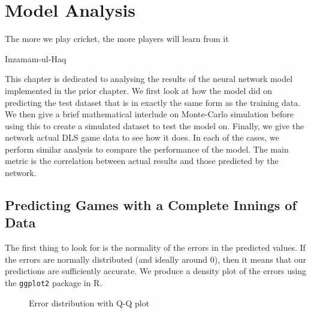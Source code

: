 \chapter{Model Analysis}
\label{modelAnalysis}

\epigraph{The more we play cricket, the more players will learn from it}{Inzamam-ul-Haq}

This chapter is dedicated to analysing the results of the neural network model implemented in the prior chapter. We first look at how the model did on predicting the test dataset 
that is in exactly the same form as the training data. We then give a brief mathematical interlude on Monte-Carlo simulation before using this to create a simulated dataset 
to test the model on. Finally, we give the network actual DLS game data to see how it does. In each of the cases, we perform similar analysis to compare the performance of the model.
The main metric is the correlation between actual results and those predicted by the network.

\section{Predicting Games with a Complete Innings of Data}
The first thing to look for is the normality of the errors in the predicted values. If the errors are normally distributed (and ideally around 0),
then it means that our predictions are sufficiently accurate. We produce a density plot of the errors using the \verb|ggplot2| package in R.

\begin{figure}[h]
    \centering
    \qquad
    \caption{Error distribution with Q-Q plot}
    \label{errDistAndQQ}
\end{figure}

